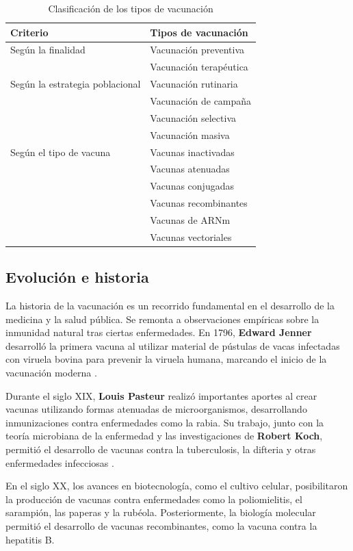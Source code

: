 \begin{table}[H]
\centering
\caption{Clasificación de los tipos de vacunación}
\label{tab:tipos_vacunacion}
\begin{tabularx}{\textwidth}{|l|X|}
\hline
\textbf{Criterio} & \textbf{Tipos de vacunación} \\
\hline
Según la finalidad &
Vacunación preventiva \\
& Vacunación terapéutica \\
\hline
Según la estrategia poblacional &
Vacunación rutinaria \\
& Vacunación de campaña \\
& Vacunación selectiva \\
& Vacunación masiva \\
\hline
Según el tipo de vacuna &
Vacunas inactivadas \\
& Vacunas atenuadas \\
& Vacunas conjugadas \\
& Vacunas recombinantes \\
& Vacunas de ARNm \\
& Vacunas vectoriales \\
\hline
\end{tabularx}
\end{table}


\subsection{Evolución e historia}
La historia de la vacunación es un recorrido fundamental en el desarrollo de la medicina y la salud pública. Se remonta a observaciones empíricas sobre la inmunidad natural tras ciertas enfermedades. En 1796, \textbf{Edward Jenner} desarrolló la primera vacuna al utilizar material de pústulas de vacas infectadas con viruela bovina para prevenir la viruela humana, marcando el inicio de la vacunación moderna \cite{damaso2018revisiting}.

Durante el siglo XIX, \textbf{Louis Pasteur} realizó importantes aportes al crear vacunas utilizando formas atenuadas de microorganismos, desarrollando inmunizaciones contra enfermedades como la rabia. Su trabajo, junto con la teoría microbiana de la enfermedad y las investigaciones de \textbf{Robert Koch}, permitió el desarrollo de vacunas contra la tuberculosis, la difteria y otras enfermedades infecciosas \cite{schwartz2022pasteurian}.

En el siglo XX, los avances en biotecnología, como el cultivo celular, posibilitaron la producción de vacunas contra enfermedades como la poliomielitis, el sarampión, las paperas y la rubéola. Posteriormente, la biología molecular permitió el desarrollo de vacunas recombinantes, como la vacuna contra la hepatitis B.

